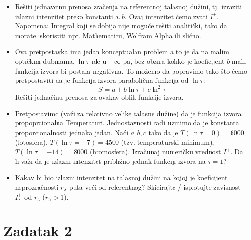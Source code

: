 \documentclass[12pt]{article}
\begin{document}
\begin{itemize}
    \item Re\v{s}iti jedna{v}cinu prenosa zra\v{c}enja na referentnoj talasnoj du\v{z}ini, tj. izraziti izlazni intenzitet preko konstanti $a, b$. Ovaj intenzitet \'{c}emo zvati $I^+$. Napomena: Integral koji se dobija nije mogu\'{c}e re\v{s}iti analiti\v{c}ki, tako da morate iskoristiti npr. Mathematicu, Wolfram Alpha ili sli\v{c}no.
    
    \item Ova pretpostavka ima jedan konceptualan problem a to je da na malim opti\v{c}kim dubinama, $\ln \tau$ ide u $-\infty$ pa, bez obzira koliko je koeficijent $b$ mali, funkcija izvora bi postala negativna. To mo\v{z}emo da popravimo tako \v{s}to \'{c}emo pretpostaviti da je funkcija izvora paraboli\v{c}na funkcija od $\ln \tau$:
    \begin{equation}
        S = a + b\ln \tau + c \ln^2 \tau
    \end{equation}
    Re\v{s}iti jedna\v{c}inu prenosa za ovakav oblik funkcije izvora. 
    
    \item Pretpostavimo (va\v{z}i za relativno velike talasne du\v{z}ine) da je funkcija izvora propoprcionalna Temperaturi. Jednostavnosti radi uzmimo da je konstanta proporcionalnosti jednaka jedan. Na\'{c}i $a, b, c$ tako da je $T(\ln\tau=0) = 6000$ (fotosfera), $T(\ln\tau=-7) = 4500$ (tzv. temperaturski minimum), $T(\ln\tau=-14) = 8000$ (hromosfera). Izra\v{c}unaj numeri\v{c}ku vrednost $I^+$. Da li va\v{z}i da je izlazni intenzitet pribli\v{z}no jednak funkciji izvora na $\tau=1$?

    \item Kakav bi bio izlazni intenzitet na talasnoj du\v{z}ini na kojoj je koeficijent neprozra\v{c}nosti $r_\lambda$ puta ve\'{c}i od referentnog? Skicirajte / isplotujte zavisnost $I^+_\lambda$ od $r_\lambda$ ($r_\lambda >  1$).
    
\end{itemize}

\section*{Zadatak 2}
\end{document}
